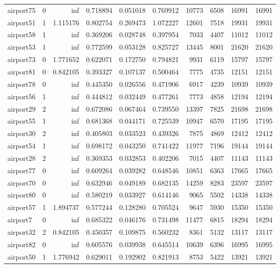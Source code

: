 \begin{longtable}{|l|r|r|r|r|r|r|r|r|r|}
airport75 & 0 & inf & 0.718894 & 0.051018 & 0.769912 & 10773 & 6508 & 16991 & 16991 \\
airport51 & 1 & 1.115176 & 0.802754 & 0.269473 & 1.072227 & 12601 & 7518 & 19931 & 19931 \\
airport58 & 1 & inf & 0.369206 & 0.028748 & 0.397954 & 7033 & 4407 & 11012 & 11012 \\
airport53 & 1 & inf & 0.772599 & 0.053128 & 0.825727 & 13445 & 8001 & 21620 & 21620 \\
airport73 & 0 & 1.771652 & 0.622071 & 0.172750 & 0.794821 & 9931 & 6119 & 15797 & 15797 \\
airport81 & 0 & 0.842105 & 0.393327 & 0.107137 & 0.500464 & 7775 & 4735 & 12151 & 12151 \\
airport78 & 0 & inf & 0.445350 & 0.026556 & 0.471906 & 6917 & 4239 & 10939 & 10939 \\
airport56 & 1 & inf & 0.444812 & 0.032449 & 0.477261 & 7773 & 4858 & 12194 & 12194 \\
airport29 & 2 & inf & 0.672086 & 0.067464 & 0.739550 & 13397 & 7825 & 21698 & 21698 \\
airport55 & 1 & inf & 0.681368 & 0.044171 & 0.725539 & 10947 & 6570 & 17195 & 17195 \\
airport30 & 2 & inf & 0.405803 & 0.033523 & 0.439326 & 7875 & 4869 & 12412 & 12412 \\
airport54 & 1 & inf & 0.698172 & 0.043250 & 0.741422 & 11977 & 7196 & 19144 & 19144 \\
airport28 & 2 & inf & 0.369353 & 0.032853 & 0.402206 & 7015 & 4407 & 11143 & 11143 \\
airport77 & 0 & inf & 0.609264 & 0.039282 & 0.648546 & 10851 & 6363 & 17665 & 17665 \\
airport70 & 0 & inf & 0.632946 & 0.049189 & 0.682135 & 14259 & 8283 & 23597 & 23597 \\
airport80 & 0 & inf & 0.580219 & 0.033927 & 0.614146 & 9065 & 5502 & 14338 & 14338 \\
airport57 & 1 & 1.894737 & 0.577244 & 0.128280 & 0.705524 & 9647 & 5930 & 15350 & 15350 \\
airport7 & 0 & inf & 0.685322 & 0.046176 & 0.731498 & 11477 & 6815 & 18294 & 18294 \\
airport32 & 2 & 0.842105 & 0.450357 & 0.109875 & 0.560232 & 8361 & 5132 & 13117 & 13117 \\
airport82 & 0 & inf & 0.605576 & 0.039938 & 0.645514 & 10639 & 6396 & 16995 & 16995 \\
airport50 & 1 & 1.776942 & 0.629011 & 0.192902 & 0.821913 & 8753 & 5422 & 13921 & 13921 \\

\end{longtable}
